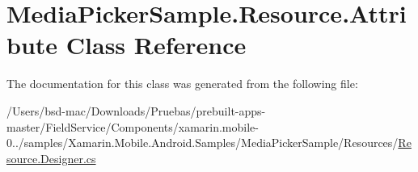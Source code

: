 \hypertarget{class_media_picker_sample_1_1_resource_1_1_attribute}{\section{Media\+Picker\+Sample.\+Resource.\+Attribute Class Reference}
\label{class_media_picker_sample_1_1_resource_1_1_attribute}
}


The documentation for this class was generated from the following file\+:\begin{DoxyCompactItemize}
\item 
/\+Users/bsd-\/mac/\+Downloads/\+Pruebas/prebuilt-\/apps-\/master/\+Field\+Service/\+Components/xamarin.\+mobile-\/0../samples/\+Xamarin.\+Mobile.\+Android.\+Samples/\+Media\+Picker\+Sample/\+Resources/\hyperlink{_components_2xamarin_8mobile-0_86_81_2samples_2_xamarin_8_mobile_8_android_8_samples_2_media_picb4289798373573612b81d1923e7d12fa}{Resource.\+Designer.\+cs}\end{DoxyCompactItemize}
